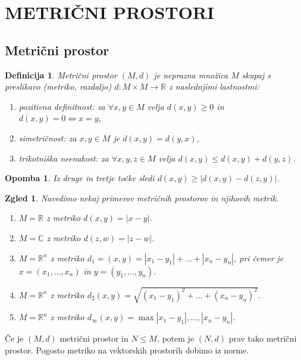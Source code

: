 \documentclass[10pt, a4paper]{article}
\newtheorem{defi}[izr]{Definicija}
\newenvironment{noticeB}{%
  \tcolorbox[%
  notitle,
  empty,
  enhanced,  %
  breakable,
  coltext=black,
  colback=white, 
  fontupper=\rmfamily,
  noparskip,
  sharp corners,
  boxrule=-1pt,  %
  frame hidden,
  left=7pt,  %
  right=7pt,
  top=5pt,
  bottom=5pt,
  before skip=2.5ex plus 2pt,
  after skip=2.5ex plus 2pt,
  borderline west = {1.5pt}{-0.1pt}{blue!30!black}, %
  overlay unbroken and last={%
    \draw[color=black, line width=1.25pt]
    ($(frame.south west)+(1.pt, -0.1pt)$) -- ++(2em, 0);
  }
  ]}
{\endtcolorbox}
\newenvironment{definicija}{\begin{noticeB}\begin{defi}}{%
\end{defi}\end{noticeB}}
\newtheorem*{opomba}{Opomba}
\newtheorem{zgled}[izr]{Zgled}
\newcommand{\R}{\mathbb {R}}
\newcommand{\C}{\mathbb {C}}
\begin{document}
\section{METRIČNI PROSTORI}

\subsection{Metrični prostor}

\begin{definicija}
    Metrični prostor $(M, d)$ je neprazna množica $M$ skupaj s preslikavo (metriko, razdaljo) $d: M \times M \rightarrow \R$
    z naslednjimi lastnostmi:
    \begin{enumerate}
        \item pozitivna definitnost: za $\forall x, y \in M$ velja $d(x,y) \geq 0$ in $d(x,y) = 0 \iff x = y$,
        \item simetričnost: za $x,y \in M$ je $d(x,y) = d(y,x)$,
        \item trikotniška neenakost: za $\forall x,y,z \in M$ velja $d(x,y) \leq d(x,y) + d(y,z)$.
    \end{enumerate}
\end{definicija}

\begin{opomba}
    Iz druge in tretje točke sledi $d(x,y) \geq |d(x,y) - d(z,y)|$.
\end{opomba}

\begin{zgled}
    Navedimo nekaj primerov metričnih prostorov in njihovih metrik.
    \begin{enumerate}
        \item $M = \R$ z metriko $d(x,y) = |x-y|$.
        \item $M = \C$ z metriko $d(z,w) = |z-w|$.
        \item $M = \R^n$ z metriko $d_1 = (x,y) = |x_1 - y_1| + \dots + |x_n - y_n|$, pri čemer je $x = (x_1, \dots, x_n)$ in $y = (y_1, \dots, y_n)$.
        \item $M = \R^n$ z metriko $d_2(x,y) = \sqrt{(x_1 - y_1)^2 + \dots + (x_n - y_n)^2}$.
        \item $M = \R^n$ z metriko $d_\infty (x,y) = \max {|x_1 - y_1|, \dots, |x_n - y_n|}$.
    \end{enumerate}
\end{zgled}

Če je $(M, d)$ metrični prostor in $N \leq M$, potem je $(N, d)$ prav tako metrični prostor.
Pogosto metriko na vektorskih prostorih dobimo iz norme.
\end{document}
